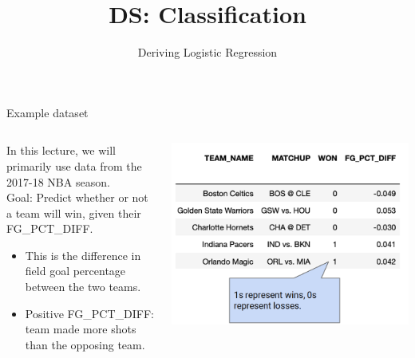 \documentclass[aspectratio=169]{../latex_main/tntbeamer}  %
\title[LR: Derivation]{DS: Classification}
\subtitle{Deriving Logistic Regression}
\begin{document}
	
	\maketitle
	\begin{frame}{Example dataset}
	    \begin{columns}
	        \begin{column}{.4\textwidth}
	                In this lecture, we will primarily use data from the 2017-18 NBA season.\\  \bigskip
	                Goal: Predict whether or not a team will win, given their FG\_PCT\_DIFF.
	                \begin{itemize}
	                    \item This is the difference in field goal percentage between the two teams.
	                    \item Positive FG\_PCT\_DIFF: team made more shots than the opposing team.
	                \end{itemize}
	        \end{column}
	        
	        \begin{column}{.4\textwidth}

	                    \includegraphics[scale=.35]{Bild3}
	                    
	        \end{column}
	    \end{columns}
	\end{frame}
	
\end{document}
